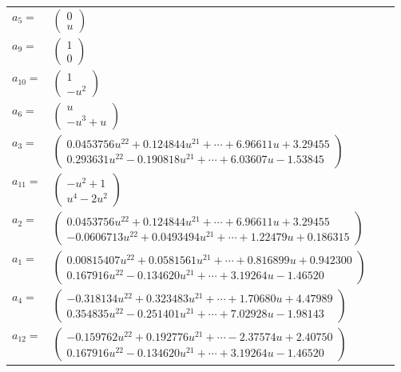 \documentclass[1p]{elsarticle_modified}
\theoremstyle{definition}
\begin{document}
\begin{tabular}{m{7pt} m{180pt} m{7pt} m{180pt} }
\flushright $a_{5}=$&$\begin{pmatrix}0\\u\end{pmatrix}$ \\
\flushright $a_{9}=$&$\begin{pmatrix}1\\0\end{pmatrix}$ \\
\flushright $a_{10}=$&$\begin{pmatrix}1\\- u^2\end{pmatrix}$ \\
\flushright $a_{6}=$&$\begin{pmatrix}u\\- u^3+u\end{pmatrix}$ \\
\flushright $a_{3}=$&$\begin{pmatrix}0.0453756 u^{22}+0.124844 u^{21}+\cdots+6.96611 u+3.29455\\0.293631 u^{22}-0.190818 u^{21}+\cdots+6.03607 u-1.53845\end{pmatrix}$ \\
\flushright $a_{11}=$&$\begin{pmatrix}- u^2+1\\u^4-2 u^2\end{pmatrix}$ \\
\flushright $a_{2}=$&$\begin{pmatrix}0.0453756 u^{22}+0.124844 u^{21}+\cdots+6.96611 u+3.29455\\-0.0606713 u^{22}+0.0493494 u^{21}+\cdots+1.22479 u+0.186315\end{pmatrix}$ \\
\flushright $a_{1}=$&$\begin{pmatrix}0.00815407 u^{22}+0.0581561 u^{21}+\cdots+0.816899 u+0.942300\\0.167916 u^{22}-0.134620 u^{21}+\cdots+3.19264 u-1.46520\end{pmatrix}$ \\
\flushright $a_{4}=$&$\begin{pmatrix}-0.318134 u^{22}+0.323483 u^{21}+\cdots+1.70680 u+4.47989\\0.354835 u^{22}-0.251401 u^{21}+\cdots+7.02928 u-1.98143\end{pmatrix}$ \\
\flushright $a_{12}=$&$\begin{pmatrix}-0.159762 u^{22}+0.192776 u^{21}+\cdots-2.37574 u+2.40750\\0.167916 u^{22}-0.134620 u^{21}+\cdots+3.19264 u-1.46520\end{pmatrix}$ \\

\end{tabular}
\end{document}
